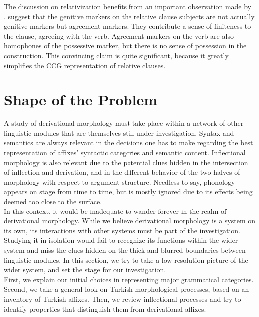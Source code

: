 \documentclass[11pt]{article} %
\begin{document}
The discussion on relativization benefits from an important observation made by \citet{GeorgeKornfilt1981}. \cite{GeorgeKornfilt1981} suggest that the genitive markers on the relative clause subjects are not actually genitive markers but agreement markers. They contribute a sense of finiteness to the clause, agreeing with the verb. Agreement markers on the verb are also homophones of the possessive marker, but there is no sense of possession in the construction. This convincing claim is quite significant, because it greatly simplifies the CCG representation of relative clauses. \\

\newpage

\section{Shape of the Problem}

A study of derivational morphology must take place within a network of other linguistic modules that are themselves still under investigation. Syntax and semantics are always relevant in the decisions one has to make regarding the best representation of affixes' syntactic categories and semantic content. Inflectional morphology is also relevant due to the potential clues hidden in the intersection of inflection and derivation, and in the different behavior of the two halves of morphology with respect to argument structure. Needless to say, phonology appears on stage from time to time, but is mostly ignored due to its effects being deemed too close to the surface. \\

In this context, it would be inadequate to wander forever in the realm of derivational morphology. While we believe derivational morphology is a system on its own, its interactions with other systems must be part of the investigation. Studying it in isolation would fail to recognize its functions within the wider system and miss the clues hidden on the thick and blurred boundaries between linguistic modules. In this section, we try to take a low resolution picture of the wider system, and set the stage for our investigation. \\

First, we explain our initial choices in representing major grammatical categories. Second, we take a general look on Turkish morphological processes, based on an inventory of Turkish affixes. Then, we review inflectional processes and try to identify properties that distinguish them from derivational affixes. \\
\end{document}
